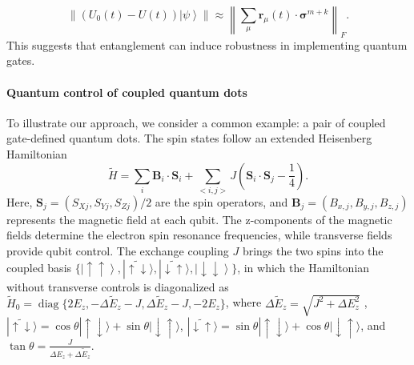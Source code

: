 \documentclass[12pt]{article}
\newcommand{\ket}[1]{\left|#1\right\rangle}
\newcommand{\norm}[1]{\left\lVert #1\right\rVert}
\begin{document}
\begin{equation}
    \norm{ (U_0(t)-U(t))\ket{\psi}} \approx \norm{\sum_{\mu}\mathbf{r}_\mu(t)\cdot \boldsymbol{\sigma}^{m+k}}_F.
\end{equation}
This suggests that entanglement can induce robustness in implementing quantum gates.

\paragraph*{Quantum control of coupled quantum dots}



To illustrate our approach, we consider a common example: a pair of coupled gate-defined quantum dots. The spin states follow an extended Heisenberg Hamiltonian~\cite{burkard2023semiconductor}
\begin{equation}
 \tilde{H}= \sum_i\mathbf{B}_i \cdot \mathbf{S}_i + \sum_{<i,j>}J
  \left( \mathbf{S}_i \cdot \mathbf{S}_j - \frac{1}{4} \right).
  \label{Eq_Heisenberg_Hamiltonian}
\end{equation}
Here, $\mathbf{S}_j = (S_{Xj}, S_{Yj}, S_{Zj}) / 2$ are the spin operators, and $\mathbf{B}_j = (B_{x, j}, B_{y, j}, B_{z, j})$ represents the magnetic field at each qubit. The z-components of the magnetic fields determine the electron spin resonance frequencies, while transverse fields provide qubit control. The exchange coupling $J$ brings the two spins into the coupled basis $\{\left|\uparrow \uparrow \right\rangle, |\tilde{\uparrow \downarrow}\rangle, |\tilde{\downarrow \uparrow}\rangle, \left|\downarrow \downarrow \right\rangle\}$, in which the Hamiltonian without transverse controls is diagonalized as $\tilde{H}_0 = \operatorname{diag} \{ 2 E_z, -
\Delta \tilde{E}_z - J, \Delta \tilde{E}_z - J, - 2 E_z \}$, where $\Delta \tilde{E}_z = \sqrt{J^2 + \Delta E_z^2}$ , $|\tilde{\uparrow \downarrow}\rangle=\cos\theta|\uparrow \downarrow\rangle+\sin\theta| \downarrow\uparrow\rangle$, $ |\tilde{\downarrow \uparrow}\rangle=\sin\theta|\uparrow \downarrow\rangle+\cos\theta| \downarrow\uparrow\rangle$, and $\tan \theta = \frac{J}{\Delta E_z + \Delta \tilde{E}_z}$.
\end{document}
